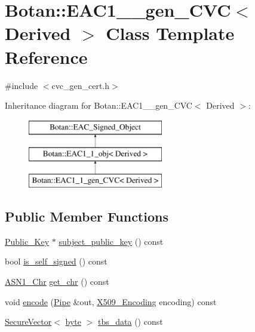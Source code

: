 \hypertarget{classBotan_1_1EAC1__1__gen__CVC}{\section{Botan\-:\-:E\-A\-C1\-\_\-\_\-gen\-\_\-\-C\-V\-C$<$ Derived $>$ Class Template Reference}
\label{classBotan_1_1EAC1__1__gen__CVC}
}


{\ttfamily \#include $<$cvc\-\_\-gen\-\_\-cert.\-h$>$}

Inheritance diagram for Botan\-:\-:E\-A\-C1\-\_\-\_\-gen\-\_\-\-C\-V\-C$<$ Derived $>$\-:\begin{figure}[H]
\begin{center}
\leavevmode
\includegraphics[height=3.000000cm]{classBotan_1_1EAC1__1__gen__CVC}
\end{center}
\end{figure}
\subsection*{Public Member Functions}
\begin{DoxyCompactItemize}
\item 
\hyperlink{classBotan_1_1Public__Key}{Public\-\_\-\-Key} $\ast$ \hyperlink{classBotan_1_1EAC1__1__gen__CVC_adc9fbc5e93acee10e246caa5bb387fb3}{subject\-\_\-public\-\_\-key} () const 
\item 
bool \hyperlink{classBotan_1_1EAC1__1__gen__CVC_a46d14634e299c84b96b1bcb3c7d5ca8c}{is\-\_\-self\-\_\-signed} () const 
\item 
\hyperlink{classBotan_1_1ASN1__Chr}{A\-S\-N1\-\_\-\-Chr} \hyperlink{classBotan_1_1EAC1__1__gen__CVC_a7a5bff7929fb7cf675536304210d85a2}{get\-\_\-chr} () const 
\item 
void \hyperlink{classBotan_1_1EAC1__1__gen__CVC_a94dbfc92c545d9d04404c14be1732177}{encode} (\hyperlink{classBotan_1_1Pipe}{Pipe} \&out, \hyperlink{namespaceBotan_a53759b4ed1fb93549f307fcf68729d2f}{X509\-\_\-\-Encoding} encoding) const 
\item 
\hyperlink{classBotan_1_1SecureVector}{Secure\-Vector}$<$ \hyperlink{namespaceBotan_a7d793989d801281df48c6b19616b8b84}{byte} $>$ \hyperlink{classBotan_1_1EAC1__1__gen__CVC_af41f854bcf3ab05584e2d4f0c01ee5f0}{tbs\-\_\-data} () const 
\end{DoxyCompactItemize}
